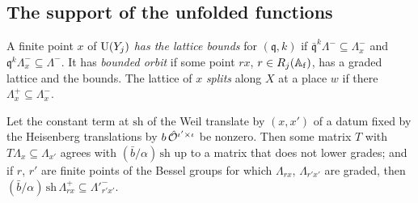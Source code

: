 \subsection{The support of the unfolded functions}\label{ss:support}
A finite point $x$ of $\operatorname{U}(Y_j)$ \emph{has the lattice bounds} for $(\mathfrak q,k)$ if $\bar{\mathfrak q}^k\Lambda^-\subseteq\Lambda^-_x$ and
$\mathfrak q^k\Lambda^-_x\subseteq\Lambda^-$. It has \emph{bounded orbit} if some point $rx$, $r\in R_j(\mathbb{A}_{\mathrm f})$, has a graded
lattice and the bounds. The lattice of $x$ \emph{splits} along $X$ at a place $w$ if there $\Lambda^+_x\subseteq\Lambda^-_x$.

\begin{lemma}\label{lem:frequency}
Let the constant term at $\mathrm{sh}$ of the Weil translate by $(x,x')$ of a datum fixed by the Heisenberg translations
by $b\,\hat{\mathcal{O}}^{\iota'\times\iota}$ be nonzero. Then some matrix $T$ with $T\Lambda_{x}\subseteq\Lambda_{x'}$ agrees with $(\bar b/\alpha)\,\mathrm{sh}$ up to
a matrix that does not lower grades; and if $r$, $r'$ are finite points of the Bessel groups for which $\Lambda_{rx}$, $\Lambda_{r'x'}$
are graded, then $(\bar b/\alpha)\,\mathrm{sh}\,\Lambda^+_{rx}\subseteq\Lambda'^-_{r'x'}$.
\end{lemma}

